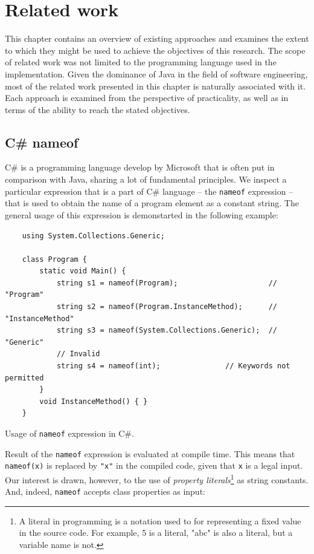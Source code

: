 \chapter{Related work}\label{chap:relwork}
This chapter contains an overview of existing approaches and examines the extent to which they might be used to achieve the objectives of this research.
The scope of related work was not limited to the programming language used in the implementation.
Given the dominance of Java in the field of software engineering, most of the related work presented in this chapter is naturally associated with it.
Each approach is examined from the perspective of practicality, as well as in terms of the ability to reach the stated objectives.

\section{C\# nameof}
C\# is a programming language develop by Microsoft that is often put in comparison with Java, sharing a lot of fundamental principles.
We inspect a particular expression that is a part of C\# language -- the \texttt{nameof} expression \cite{cSharp-nameof} -- that is used to obtain the name of a program element as a constant string.
The general usage of this expression is demonstarted in the following example:

\begin{listing}[H]
    \begin{verbatim}
    using System.Collections.Generic;

    class Program {
        static void Main() {
            string s1 = nameof(Program);                     // "Program"
            string s2 = nameof(Program.InstanceMethod);      // "InstanceMethod"
            string s3 = nameof(System.Collections.Generic);  // "Generic"
            // Invalid
            string s4 = nameof(int);               // Keywords not permitted
        }
        void InstanceMethod() { }
    }
    \end{verbatim}
    \caption{Usage of \texttt{nameof} expression in C\#.}
    \label{lst:csharp-nameof}
\end{listing}

Result of the \texttt{nameof} expression is evaluated at compile time.
This means that \texttt{nameof(x)} is replaced by \texttt{"x"} in the compiled code, given that \texttt{x} is a legal input.
Our interest is drawn, however, to the use of \textit{property literals}\footnote{A literal in programming is a notation used to for representing a fixed value in the source code. For example, 5 is a literal, "abc" is also a literal, but a variable name is not.} as string constants. And, indeed, \texttt{nameof} accepts class properties as input:

